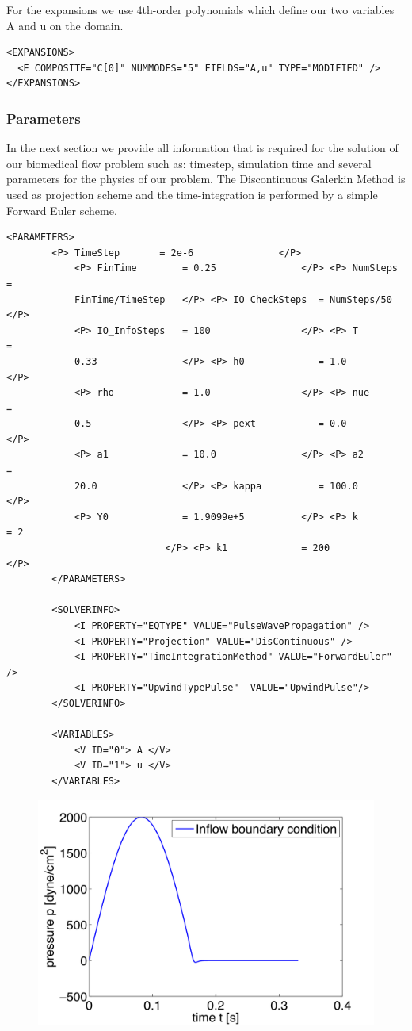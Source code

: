 For the expansions we use 4th-order polynomials which define our two variables A
and u on the domain.

\begin{lstlisting}[style=XmlStyle]
<EXPANSIONS>
  <E COMPOSITE="C[0]" NUMMODES="5" FIELDS="A,u" TYPE="MODIFIED" />
</EXPANSIONS>
\end{lstlisting}

\subsubsection{Parameters}

In the next section we provide all information that is required for the solution
of our biomedical flow problem such as: timestep, simulation time and several
parameters for the physics of our problem. The Discontinuous Galerkin
Method is used as projection scheme and the time-integration is performed by a
simple Forward Euler scheme.
\begin{lstlisting}[style=XmlStyle]
<PARAMETERS>
        <P> TimeStep       = 2e-6               </P>
            <P> FinTime        = 0.25               </P> <P> NumSteps       =
            FinTime/TimeStep   </P> <P> IO_CheckSteps  = NumSteps/50        </P>
            <P> IO_InfoSteps   = 100                </P> <P> T              =
            0.33               </P> <P> h0             = 1.0                </P>
            <P> rho            = 1.0                </P> <P> nue            =
            0.5                </P> <P> pext           = 0.0                </P>
            <P> a1             = 10.0               </P> <P> a2             =
            20.0               </P> <P> kappa          = 100.0              </P>
            <P> Y0             = 1.9099e+5          </P> <P> k              = 2 
                            </P> <P> k1             = 200                </P>
        </PARAMETERS>
        
        <SOLVERINFO>
            <I PROPERTY="EQTYPE" VALUE="PulseWavePropagation" />
            <I PROPERTY="Projection" VALUE="DisContinuous" />
            <I PROPERTY="TimeIntegrationMethod" VALUE="ForwardEuler" />
            <I PROPERTY="UpwindTypePulse"  VALUE="UpwindPulse"/> 
        </SOLVERINFO>

        <VARIABLES>
            <V ID="0"> A </V>
            <V ID="1"> u </V>
        </VARIABLES>
\end{lstlisting}

\begin{figure}
	\centering
	\includegraphics[width=0.49\linewidth]{Figures/Inflow.png}
	\caption{}
	\label{f:pulsewave:stented:inflow}
\end{figure}

